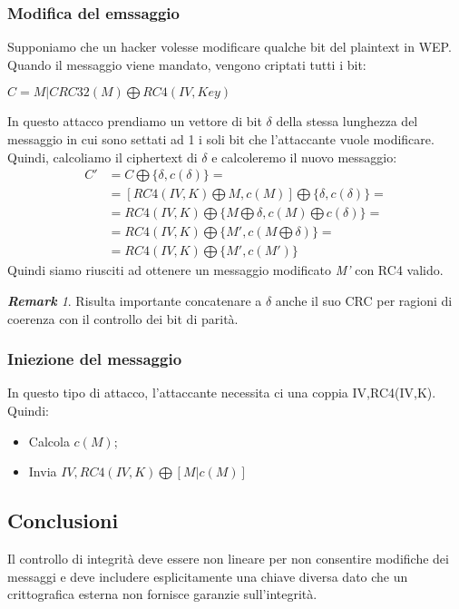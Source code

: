 \documentclass{article}
\theoremstyle{remark}
\newtheorem*{remark}{\textbf{Remark}}
\begin{document}
\subsubsection{Modifica del emssaggio}
Supponiamo che un hacker volesse modificare qualche bit del plaintext in WEP.\newline
Quando il messaggio viene mandato, vengono criptati tutti i bit:
\begin{center}
    $C=M|CRC32(M)\bigoplus RC4(IV,Key)$
\end{center}
In questo attacco prendiamo un vettore di bit $\delta$ della stessa lunghezza del messaggio in cui sono settati ad 1 i soli bit che l'attaccante vuole modificare. Quindi, calcoliamo il ciphertext di $\delta$ e calcoleremo il nuovo messaggio:
\begin{align*}
    C'&=C\bigoplus \{ \delta,c(\delta)\}=\\
&=[RC4(IV,K)\bigoplus {M,c(M)}]\bigoplus \{\delta,c(\delta)\}=\\
&=RC4(IV,K)\bigoplus \{M\bigoplus\delta,c(M)\bigoplus c(\delta)\}=\\
&=RC4(IV,K)\bigoplus \{M',c(M\bigoplus \delta)\}=\\
&=RC4(IV,K)\bigoplus \{M',c(M')\}
\end{align*}
Quindi siamo riusciti ad ottenere un messaggio modificato \emph{M'} con RC4 valido.
\begin{remark}
Risulta importante concatenare a $\delta$ anche il suo CRC per ragioni di coerenza con il controllo dei bit di parità.
\end{remark}
\subsubsection{Iniezione del messaggio}
In questo tipo di attacco, l'attaccante necessita ci una coppia IV,RC4(IV,K). Quindi:
\begin{itemize}
    \item Calcola $c(M)$;
    \item Invia $IV,RC4(IV,K)\bigoplus [M|c(M)]$
\end{itemize} 
\subsection{Conclusioni}
Il controllo di integrità deve essere non lineare per non consentire modifiche dei messaggi e deve includere esplicitamente una chiave diversa dato che un crittografica esterna non fornisce garanzie sull'integrità.
\end{document}
